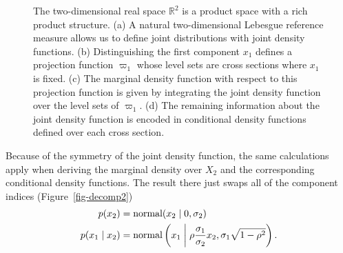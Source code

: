 \documentclass[
  letterpaper,
  DIV=11,
  numbers=noendperiod]{scrartcl}
\begin{document}
\begin{figure}
\caption{\label{fig-decomp1}The two-dimensional real space
\(\mathbb{R}^{2}\) is a product space with a rich product structure. (a)
A natural two-dimensional Lebesgue reference measure allows us to define
joint distributions with joint density functions. (b) Distinguishing the
first component \(x_{1}\) defines a projection function \(\varpi_{1}\)
whose level sets are cross sections where \(x_{1}\) is fixed. (c) The
marginal density function with respect to this projection function is
given by integrating the joint density function over the level sets of
\(\varpi_{1}\). (d) The remaining information about the joint density
function is encoded in conditional density functions defined over each
cross section.}

\end{figure}%

Because of the symmetry of the joint density function, the same
calculations apply when deriving the marginal density over \(X_{2}\) and
the corresponding conditional density functions. The result there just
swaps all of the component indices (Figure~\ref{fig-decomp2})
\begin{align*}
p ( x_{2} )
&=
\text{normal} ( x_{2} \mid 0, \sigma_{2} )
\\
p ( x_{1} \mid x_{2} )
&=
\text{normal} \left(
  x_{1} \biggm|
  \rho \frac{ \sigma_{1} }{ \sigma_{2} } x_{2},
  \sigma_{1} \sqrt{ 1 - \rho^{2} }
\right).
\end{align*}
\end{document}
